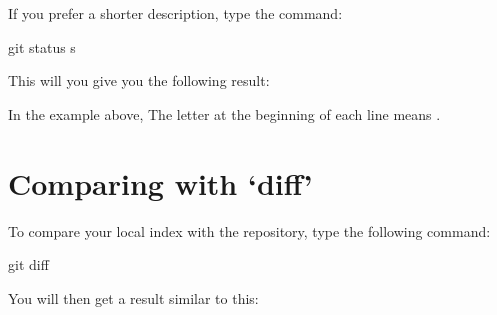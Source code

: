 \documentclass[a4paper,10pt,english,openany,oneside]{sphinxmanual}
\begin{document}
\sphinxAtStartPar
If you prefer a shorter description, type the command:

\begin{sphinxVerbatim}[commandchars=\\\{\}]
git status \PYGZhy{}s
\end{sphinxVerbatim}

\sphinxAtStartPar
This will you give you the following result:

\begin{sphinxVerbatim}[commandchars=\\\{\}]
\end{sphinxVerbatim}

\sphinxAtStartPar
In the example above, The letter  at the beginning of each line means .


\section{Comparing with ‘diff’}
\label{\detokenize{gitinminutes:comparing-with-diff}}
\sphinxAtStartPar
To compare your local index with the repository, type the following command:

\begin{sphinxVerbatim}[commandchars=\\\{\}]
git diff
\end{sphinxVerbatim}

\sphinxAtStartPar
You will then get a result similar to this:
\end{document}

